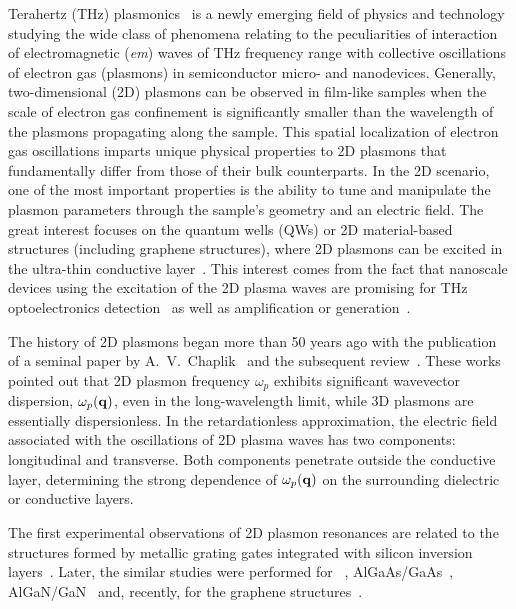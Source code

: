 \documentclass[%
 reprint,
 amsmath,amssymb,
 aps,
]{revtex4-2}
\begin{document}
Terahertz (THz) plasmonics~\cite{Otsuji2014, Shur2020} is a newly emerging field of physics and technology studying the wide class of phenomena relating to the peculiarities of interaction of electromagnetic (\textit{em}) waves of THz frequency range with collective oscillations of electron gas (plasmons) in semiconductor micro- and nanodevices. 
Generally, two-dimensional (2D) plasmons can be observed in film-like samples when the scale of electron gas confinement is significantly smaller than the wavelength of the plasmons propagating along the sample. 
This spatial localization of electron gas oscillations imparts unique physical properties to 2D plasmons that fundamentally differ from those of their bulk counterparts. 
In the 2D scenario, one of the most important properties is the ability to tune and manipulate the plasmon parameters through the sample's geometry and an electric field.
The great interest focuses on the quantum wells (QWs) or 2D material-based structures (including graphene structures), where 2D plasmons can be excited in the ultra-thin conductive layer~\cite{Otsuji2014, Shur2020, Huang2017, knap2009field}.
This interest comes from the fact that nanoscale devices using the excitation of the 2D plasma waves are promising for THz optoelectronics detection~\cite{knap2009field, Shaner2005, Knap2011, Kurita2011, Spisser2016, Delgado2022} as well as amplification or generation~\cite{dyakonov1993, Michailov1998, Kachorovskii2012, Mikhailov2016, Petrov2017, Svintsov2019, KorPRB2020}.

The history of 2D plasmons began more than 50 years ago with the publication of a seminal paper by A.~V.~Chaplik~\cite{Chaplik1972} and the subsequent review~\cite{Chaplik1985}. These works pointed out that 2D plasmon frequency $\omega_{p}$ exhibits significant wavevector dispersion, $\omega_{p}({\bf q})$, even in the long-wavelength limit, while 3D plasmons are essentially dispersionless. 
In the retardationless approximation, the electric field associated with the oscillations of 2D plasma waves has two components: longitudinal and transverse. 
Both components penetrate outside the conductive layer, determining the strong dependence of $\omega_{p}({\bf q})$ on the surrounding dielectric or conductive layers.

The first experimental observations of 2D plasmon resonances are related to the structures formed by metallic grating gates integrated with silicon inversion layers~\cite{Allen1977, Tsui1978, Tsui1980}. Later, the similar studies were performed for ~\cite{Peale2013}, AlGaAs/GaAs~\cite{Bialek2014}, AlGaN/GaN~\cite{muravjov2010,Qin2016,jakvstas2017,shalygin2019} and, recently, for the graphene structures~\cite{Yan2012,Yan2015,li2019current}.
\end{document}
